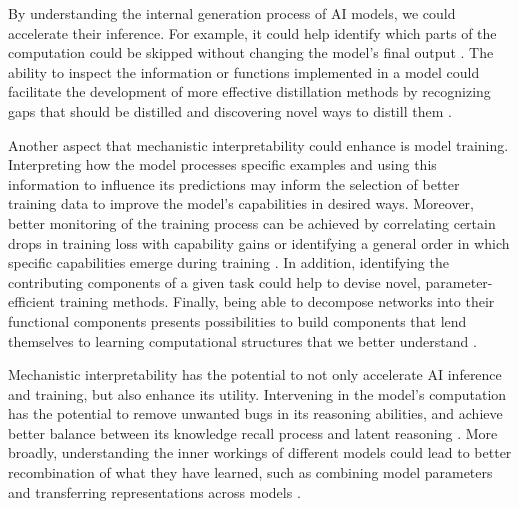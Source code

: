 By understanding the internal generation process of AI models, we could accelerate their inference. For example, it could help identify which parts of the computation could be skipped without changing the model's final output \citep{voita-2019-analyzing, din2024jumpconclusionsshortcuttingtransformers, voita-etal-2024-neurons, gromov2024unreasonableineffectivenessdeeperlayers}. The ability to inspect the information or functions implemented in a model could facilitate the development of more effective distillation methods by recognizing gaps that should be distilled \citep{gottesman2024estimatingknowledgelargelanguage} and discovering novel ways to distill them \citep{zhang2024instillinginductivebiasessubnetworks}.

Another aspect that mechanistic interpretability could enhance is model training. Interpreting how the model processes specific examples and using this information to influence its predictions \citep{Koh_2017_influence_function,grosse2023studyinglargelanguagemodel} may inform the selection of better training data to improve the model's capabilities in desired ways. Moreover, better monitoring of the training process can be achieved by correlating certain drops in training loss with capability gains \citep{olsson2022incontextlearninginductionheads, wang2024grokkedtransformersimplicitreasoners} or identifying a general order in which specific capabilities emerge during training \citep{michaud2023the}. In addition, identifying the contributing components of a given task could help to devise novel, parameter-efficient training methods. Finally, being able to decompose networks into their functional components presents possibilities to build components that lend themselves to learning computational structures that we better understand \citep{crowson2022vqganclipopendomainimage,fu2023hungry}.

Mechanistic interpretability has the potential to not only accelerate AI inference and training, but also enhance its utility. Intervening in the model’s computation has the potential to remove unwanted bugs in its reasoning abilities, and achieve better balance between its knowledge recall process and latent reasoning \citep{yu-etal-2023-characterizing,jin-etal-2024-cutting,biran2024hoppinglateexploringlimitations,balesni2024twohopcursellmstrained}. More broadly, understanding the inner workings of different models could lead to better recombination of what they have learned, such as combining model parameters \citep{wortsman_2022_ModelSoups} and transferring representations across models \citep{ghandeharioun2024patchscopes, csiszarik2021similarity}.



